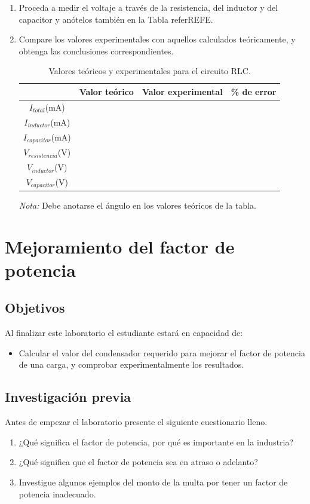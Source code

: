 \documentclass{report}
\newcommand{\obj}{Objetivos}
\newcommand{\inv}{Investigación previa}
\newcommand{\capacidad}{Al finalizar este laboratorio el estudiante estará en capacidad de:}
\newcommand{\antesde}{Antes de empezar el laboratorio presente el siguiente cuestionario lleno.}
\begin{document}
\begin{enumerate}
\emph{Nota:} Asegúrese de apagar el generador de audio cada vez que cambie la ubicación del multímetro digital, para ponerlo en serie con el elemento siguiente.
\item Proceda a medir el voltaje a través de la resistencia, del inductor y del capacitor y anótelos también en la Tabla referREFE.
\item Compare los valores experimentales con aquellos calculados teóricamente, y obtenga las conclusiones correspondientes.

\begin{table}[H]
	\caption{Valores teóricos y experimentales para el circuito RLC.}
	\label{tab:L11T2}
	\centering
	\begin{tabular}[h]{|c|c|c|c|}
		\cline{2-4}
		\multicolumn{1}{c|}{} &
		\multicolumn{1}{c|}{Valor teórico} &
		\multicolumn{1}{c|}{Valor experimental} &
		\multicolumn{1}{c|}{\% de error}\\
		\hline
		$I_{total}$(mA) & {} & {} & {} \\
		\hline
		$I_{inductor}$(mA) & {} & {} & {} \\
		\hline
		$I_{capacitor}$(mA) & {} & {} & {} \\
		\hline
		$V_{resistencia}$(V) & {} & {} & {} \\
		\hline
		$V_{inductor}$(V) & {} & {} & {} \\
		\hline
		$V_{capacitor}$(V) & {} & {} & {} \\
		\hline
	\end{tabular}
\begin{flushleft}
\emph{Nota:} Debe anotarse el ángulo en los valores teóricos de la tabla.
\end{flushleft}
\end{table}
\end{enumerate}

\chapter{Mejoramiento del factor de potencia}
\section{\obj}
\capacidad
\begin{itemize}
\item Calcular el valor del condensador requerido para mejorar el factor de potencia de una carga, y comprobar experimentalmente los resultados.
\end{itemize}
\section{\inv}
\antesde
\begin{enumerate}
\item ¿Qué significa el factor de potencia, por qué es importante en la industria?
\item ¿Qué significa que el factor de potencia sea en atraso o adelanto?
\item Investigue algunos ejemplos del monto de la multa por tener un factor de potencia inadecuado.
\end{enumerate}
\end{document}
